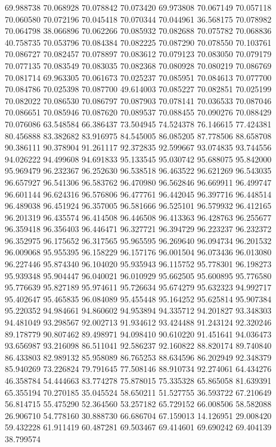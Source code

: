 69.988738
70.068928
70.078842
70.073420
69.973808
70.067149
70.057118
70.060580
70.072196
70.045418
70.070344
70.044961
36.568175
70.078982
70.064798
38.066896
70.062266
70.085932
70.082688
70.075782
70.068836
40.758735
70.053796
70.084384
70.082225
70.087290
70.078550
70.103761
70.086727
70.082457
70.078897
70.083612
70.079123
70.083050
70.079179
70.077135
70.083549
70.083035
70.082368
70.080928
70.080219
70.086769
70.081714
69.963305
70.061673
70.025237
70.085951
70.084613
70.077700
70.084786
70.025398
70.087700
49.614003
70.085227
70.082851
70.025199
70.082022
70.086530
70.086797
70.087903
70.078141
70.036533
70.087046
70.086651
70.085946
70.087620
70.089537
70.088455
70.090276
70.088429
70.076086
63.548584
66.386437
73.504945
74.524378
76.146615
77.424381
80.456888
83.382682
83.916975
84.545005
86.085205
87.778506
88.658708
90.386111
90.378904
91.261117
92.372835
92.599667
93.074835
93.744556
94.026222
94.499608
94.691833
95.133545
95.030742
95.688075
95.842000
95.969479
96.232367
96.252630
96.538518
96.463522
96.621269
96.543035
96.657927
96.541306
96.583762
96.470980
96.562846
96.669911
96.499747
96.601144
96.624316
96.576806
96.477761
96.442045
96.397716
96.448514
96.489038
96.451924
96.357005
96.581666
96.525101
96.579932
96.412165
96.201319
96.435574
96.414508
96.446508
96.413363
96.428763
96.255677
96.359418
96.356403
96.446471
96.327721
96.394729
96.223237
96.232372
96.352975
96.175652
96.317565
95.965595
96.269640
96.094734
96.201532
96.009068
95.955395
96.158229
96.157176
96.001504
96.073436
96.013080
96.227446
95.874340
96.104020
95.935943
96.115752
95.778301
96.198273
95.939348
95.904447
96.040021
96.010929
95.662505
95.600895
95.776580
95.776639
95.827189
95.974611
95.726634
95.674279
95.632323
94.992717
95.402647
95.465835
96.084089
95.455448
95.164252
95.625814
95.907384
95.220352
94.984661
94.860602
94.953894
94.335712
94.201827
93.348303
94.481049
93.298567
92.002713
91.934612
93.424488
91.243124
92.320246
89.178779
90.807462
89.498971
94.098410
90.610220
91.451641
94.036473
93.656987
93.216098
86.511041
92.586237
92.160822
88.820174
89.740840
86.433803
82.989132
85.958089
86.765253
88.634596
86.202949
92.348379
85.940269
73.226824
79.791645
77.508146
88.910734
92.274061
64.434276
46.358784
54.444663
83.774278
75.878015
75.335328
65.865058
81.639391
65.355194
70.270185
35.045524
58.650211
51.527755
36.593722
67.210649
56.814715
55.475290
52.364560
53.257182
65.729152
66.008506
58.582088
26.906710
54.778160
30.888730
66.686704
67.159013
14.126951
29.008420
59.432228
61.911419
60.487281
69.503467
69.414601
69.690242
69.404139
38.799574
